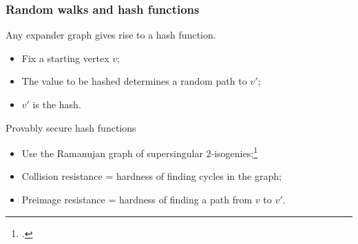 \documentclass{beamer}
\begin{document}
\begin{frame}
  \frametitle{Random walks and hash functions}

  Any expander graph gives rise to a hash function.

  \begin{center}
  \end{center}

  \begin{itemize}
  \item Fix a starting vertex \emph{$v$};
  \item The value to be hashed determines a random path to \emph{$v'$};
  \item \emph{$v'$} is the hash.
  \end{itemize}

  \begin{block}{Provably secure hash functions}
    \begin{itemize}
    \item Use the Ramanujan graph of \alert{supersingular
        $2$-isogenies};\footcite{charles+lauter+goren09}
    \item \alert{Collision resistance} = hardness of finding cycles in the graph;
    \item \alert{Preimage resistance} = hardness of finding a path
      from \emph{$v$} to \emph{$v'$}.
    \end{itemize}
  \end{block}
\end{frame}

\end{document}
